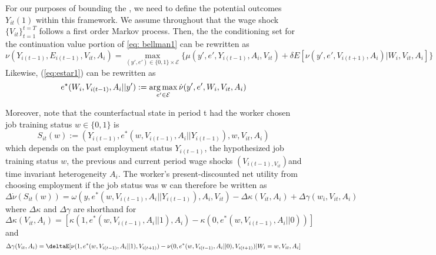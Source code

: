 \documentclass{article}
\begin{document}
For our purposes of bounding the , we need to define the potential outcomes $Y_{it}(1)$ within this framework. We assume throughout that the wage shock $\{V_{it}\}_{t=1}^{t=T}$ follows a first order Markov process.
Then, the the conditioning set for the continuation value portion of \ref{eq: bellman1} can be rewritten as
\begin{equation}
\nu(Y_{i(t-1)}, E_{i(t-1)}, V_{it}, A_i) = \max_{(y', e') \in \{0,1\} \times \mathcal{E}} \{ \mu(y', e', Y_{i(t-1)},A_i, V_{it} )  + \delta E[ \nu(y', e', V_{i(t+1)}, A_i) | W_i, V_{it}, A_i ] \} 
\end{equation}
Likewise, (\ref{eq:estar1}) can be rewritten as 
\begin{equation}
    \label{eq:estar2}
    e^ \star  (W_i,V_{i(t-1)}, A_i  || y' ) : = \operatorname*{arg\,max} _ { e' \in \mathcal{ E} } \dot{ \nu} ( y', e', W_i, V_{it}, A_ i ) 
\end{equation}




Moreover, note that the counterfactual state in period t had the worker chosen job training status $w \in \{0,1\}$ is 
\begin{equation}
    S_{it}(w) := ( Y_{i(t-1)}, e^*( w, V_{i(t-1)}, A_i || Y_{i(t-1)}), w, V_{it}, A_i)
\end{equation}
which depends on the past employment status $Y_{i(t-1)}$, the hypothesized job training status $w$, the previous and current period wage shocks $( V_{i(t-1), V_{it}})$and time invariant heterogeneity $A_i$.
The worker's present-discounted net utility from choosing employment if the job status  was w can therefore be written as
\begin{equation}
    \Delta \dot{\nu}( S_{it}(w)) = \omega ( y, e^*( w, V_{i(t-1)}, A_i || Y_{i(t-1)}), A_i, V_{it} ) - \Delta \kappa ( V_{it}, A_i) + \Delta \gamma(w_i,V_{it}, A_i)
\end{equation}
where $\Delta \kappa $ and $\Delta \gamma $ are shorthand for 
\begin{equation*}
    \Delta \kappa( V_{it},A_i) = [ \kappa ( 1, e^*( w, V_{i(t-1)}, A_i || 1), A_i) - \kappa ( 0, e^*( w, V_{i(t-1)}, A_i || 0))]
\end{equation*}
and
\begin{equation*}
    \Delta \gamma( V_{it}, A_i ) = \deltaE [ \nu(1, e^*( w, V_{i(t-1)}, A_i || 1), V_{i(t+1)})  - \nu(0, e^*( w, V_{i(t-1)}, A_i || 0), V_{i(t+1)}) | W_i = w ,V_{it}, A_i]
\end{equation*}
\end{document}
